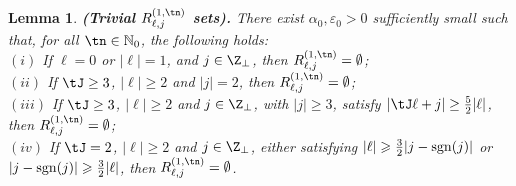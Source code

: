 \documentclass[a4paper,reqno,10pt]{article}
\newtheorem{lem}{Lemma}[section]
\begin{document}
\begin{lem}\label{lemma.empty.n}
{\bf (Trivial $R_{\ell,j}^{(1,\tn)}$ sets).}
    There exist $\alpha_{0}, \varepsilon_{0} > 0$ sufficiently small such that, for all $\tn \in \mathbb{N}_0$, the following holds:
    \\[1mm]
    \noindent $(i)$ If $\ell=0$ or $|\ell|=1$, and $j\in\Z_{\perp}$, then $R_{\ell,j}^{(1,\tn)}=\emptyset$;
    \\[1mm]
    \noindent $(ii)$  If $\tJ\geq 3$, $|\ell|\geq 2$ and $|j|=2$, then $R_{\ell,j}^{(1,\tn)}=\emptyset$;
    \\[1mm]
    \noindent $(iii)$ If $\tJ\geq 3$, $|\ell|\geq 2$ and $j\in\Z_{\perp}$, with $|j|\geq 3$,  satisfy $|\tJ \ell + j| \geq \tfrac52 |\ell|$, then $R_{\ell,j}^{(1,\tn)}=\emptyset$;
    \\[1mm]
    \noindent $(iv)$  If $\tJ=2$, $|\ell|\geqslant 2$  and $j\in \Z_{\perp} $, either satisfying $|\ell|\geqslant \tfrac32|j-{\rm sgn}(j)|$ or  $ |j-{\rm sgn}(j)|\geqslant \tfrac32|\ell|$, then $R_{\ell,j}^{(1,\tn)}=\emptyset$.
\end{lem}
\end{document}
